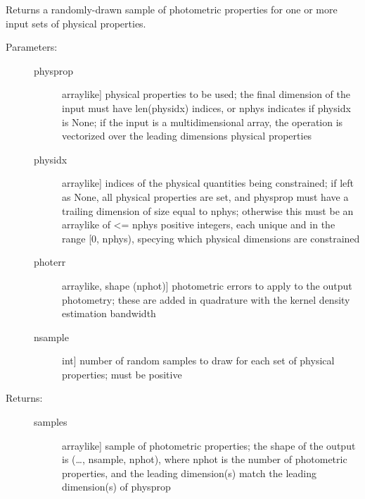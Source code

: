 \documentclass[letterpaper,10pt,english]{sphinxmanual}
\begin{document}
\begin{fulllineitems}
\begin{fulllineitems}
\end{fulllineitems}


\begin{fulllineitems}
\label{\detokenize{bayesphot:slugpy.bayesphot.bp.bp.draw_phot}}
Returns a randomly-drawn sample of photometric properties for
one or more input sets of physical properties.
\begin{description}
\item[{Parameters:}] \leavevmode\begin{description}
\item[{physprop}] \leavevmode{[}arraylike{]}
physical properties to be used; the final dimension of
the input must have len(physidx) indices, or nphys
indicates if physidx is None; if the input is a
multidimensional array, the operation is vectorized over
the leading dimensions physical properties

\item[{physidx}] \leavevmode{[}arraylike{]}
indices of the physical quantities being constrained; if
left as None, all physical properties are set, and
physprop must have a trailing dimension of size equal to
nphys; otherwise this must be an arraylike of \textless{}= nphys
positive integers, each unique and in the range {[}0,
nphys), specying which physical dimensions are
constrained

\item[{photerr}] \leavevmode{[}arraylike, shape (nphot){]}
photometric errors to apply to the output photometry;
these are added in quadrature with the kernel density
estimation bandwidth

\item[{nsample}] \leavevmode{[}int{]}
number of random samples to draw for each set of
physical properties; must be positive

\end{description}

\item[{Returns:}] \leavevmode\begin{description}
\item[{samples}] \leavevmode{[}arraylike{]}
sample of photometric properties; the shape of the
output is (…, nsample, nphot), where nphot is the
number of photometric properties, and the leading
dimension(s) match the leading dimension(s) of physprop


\end{description}
\end{description}
\end{fulllineitems}
\end{fulllineitems}
\end{document}
